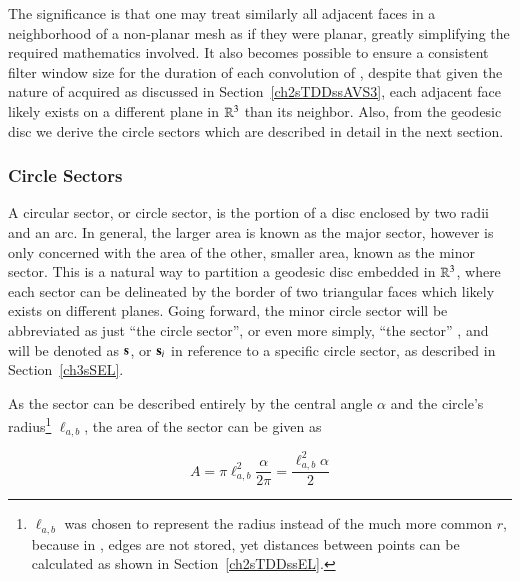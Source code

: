 The significance is that one may treat similarly all adjacent faces in a neighborhood of a non-planar mesh as if they were planar, greatly simplifying the required mathematics involved. It also becomes possible to ensure a consistent filter window size for the duration of each convolution of , despite that given the nature of acquired \tdd{} as discussed in Section~\ref{ch2sTDDssAVS3}, each adjacent face likely exists on a different plane in $\mathbb{R}^{3}$ than its neighbor. Also, from the geodesic disc we derive the circle sectors which are described in detail in the next section.
%
%

%
%
\subsubsection{Circle Sectors}
\label{ch2sETBssGsssCS}
A circular sector, or circle sector, is the portion of a disc enclosed by two radii and an arc. In general, the larger area is known as the major sector, however  is only concerned with the area of the other, smaller area, known as the minor sector. This is a natural way to partition a geodesic disc embedded in $\mathbb{R}^{3}$, where each sector can be delineated by the border of two triangular faces which likely exists on different planes. Going forward, the minor circle sector will be abbreviated as just ``the circle sector'', or even more simply, ``the \gls{sector}''
, and will be denoted as $\mathbf{s}$, or $\mathbf{s}_i$ in reference to a specific circle sector, as described in Section~\ref{ch3sSEL}.%
%
%

As the sector can be described entirely by the central angle $\alpha$ and the circle's radius\footnote{$\ell_{a,b}$ was chosen to represent the radius instead of the much more common $r$, because in \tdd{}, edges are not stored, yet distances between points can be calculated as shown in Section~\ref{ch2sTDDssEL}.} $\ell_{a,b}$, the area of the sector can be given as

\begin{equation}
	A = \pi \ell_{a,b}^2\frac{\alpha}{2\pi} = \frac{\ell_{a,b}^2\alpha}{2}
	\label{eq:areaOfCircleSector}
\end{equation}

